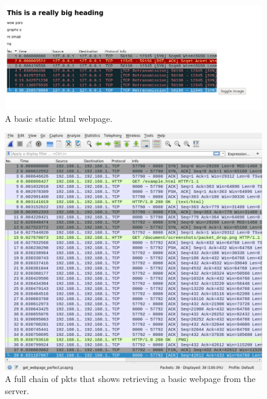 \documentclass[titlepage]{article}
\begin{document}
\begin{figure}[H]
  \centering
  \includegraphics[width=\textwidth]{screenshots/basic_webpage.png}
  \caption{%
    A basic static \gls{html} webpage.
  }\label{basicwebpage}
\end{figure}

\begin{figure}[H]
  \centering
  \includegraphics[width=\textwidth]{screenshots/website_get.png}
  \caption{%
    A full chain of \glspl{pkt} that shows retrieving a basic webpage
    from the server.
  }\label{getrequest}
\end{figure}
\end{document}
